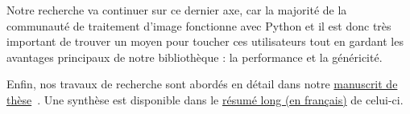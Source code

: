 \documentclass[11pt,a4paper,sans]{article} %
\begin{document}
Notre recherche va continuer sur ce dernier axe, car la majorité de la communauté de traitement d'image fonctionne avec
Python et il est donc très important de trouver un moyen pour toucher ces utilisateurs tout en gardant les avantages
principaux de notre bibliothèque : la performance et la généricité.

Enfin, nos travaux de recherche sont abordés en détail dans notre
\href{https://dutiona.github.io/thesis/manuscript.pdf}{manuscrit de thèse}~\parencite{roynard.2022.phd}. Une synthèse
est disponible dans le \href{https://dutiona.github.io/thesis/resume_long.pdf}{résumé long (en français)} de celui-ci.

\clearpage

\renewcommand{\refname}{Publications}
%
\printbibliography[heading=bibintoc]
\end{document}
